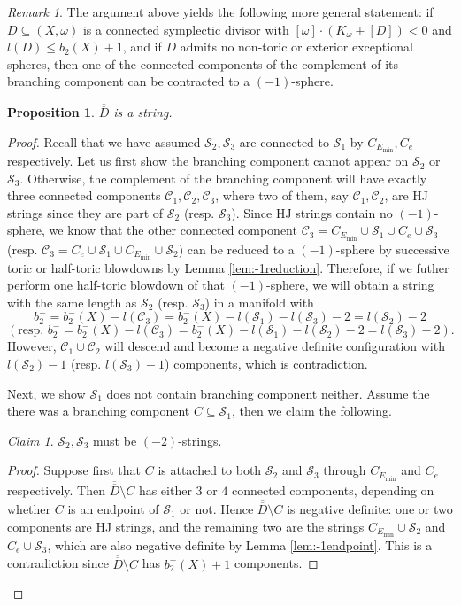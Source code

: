 \documentclass[11pt]{article}
\newtheorem{proposition}[theorem]{Proposition}
\theoremstyle{definition}
\theoremstyle{remark}
\newtheorem{remark}[theorem]{Remark}
\newtheorem{claim}[theorem]{Claim}
\newcommand{\st}{\mathcal{S}}
\begin{document}
\begin{remark}\label{rmk:-1reduction}
  The argument above yields the following more general statement: if $D\subseteq (X,\omega)$ is a connected symplectic divisor with $[\omega]\cdot (K_\omega+[D])<0$ and $l(D)\leq b_2(X)+1$, and if $D$ admits no non-toric or exterior exceptional spheres, then one of the connected components of the complement of its branching component can be contracted to a $(-1)$-sphere.
\end{remark}


\begin{proposition}\label{prop:isstring}
$\overline{\overline{D}}$ is a string.
\end{proposition}

\begin{proof}
  Recall that we have assumed $\st_2,\st_3$ are connected to $\st_1$ by $C_{E_{\text{min}}},C_e$ respectively. Let us first show the branching component cannot appear on $\st_2$ or $\st_3$. Otherwise, the complement of the branching component will have exactly three connected components $\mathcal{C}_1,\mathcal{C}_2,\mathcal{C}_3$, where two of them, say $\mathcal{C}_1,\mathcal{C}_2$, are HJ strings since they are part of $\st_2$ (resp. $\st_3$). Since HJ strings contain no $(-1)$-sphere, we know that the other connected component $\mathcal{C}_3=C_{E_\text{min}}\cup \st_1\cup C_e\cup \st_3$ (resp. $\mathcal{C}_3=C_e\cup \st_1\cup C_{E_\text{min}}\cup \st_2$) can be reduced to a $(-1)$-sphere by successive toric or half-toric blowdowns by Lemma \ref{lem:-1reduction}. Therefore, if we futher perform one half-toric blowdown of that $(-1)$-sphere, we will obtain a string with the same length as $\st_2$ (resp. $\st_3$) in a manifold with \[b_2^-=b_2^-(X)-l(\mathcal{C}_3)=b_2^-(X)-l(\st_1)-l(\st_3)-2=l(\st_2)-2\]
  \[(\text{resp. } b_2^-=b_2^-(X)-l(\mathcal{C}_3)=b_2^-(X)-l(\st_1)-l(\st_2)-2=l(\st_3)-2).\] However, $\mathcal{C}_1\cup \mathcal{C}_2$ will descend and become a negative definite configuration with $l(\st_2)-1$ (resp. $l(\st_3)-1$) components, which is contradiction.

  Next, we show $\st_1$ does not contain branching component neither. Assume the there was a branching component $C\subseteq \st_1$, then we claim the following.
  \begin{claim}
$\st_2,\st_3$ must be $(-2)$-strings.
\end{claim}

\begin{proof}
  Suppose first that $C$ is attached to both $\st_2$ and $\st_3$ through $C_{E_{\text{min}}}$ and $C_e$ respectively. Then $\overline{\overline{D}}\setminus C$ has either $3$ or $4$ connected components, depending on whether $C$ is an endpoint of $\st_1$ or not. Hence $\overline{\overline{D}}\setminus C$ is negative definite: one or two components are HJ strings, and the remaining two are the strings $C_{E_{\text{min}}}\cup \st_2$ and $C_e\cup \st_3$, which are also negative definite by Lemma \ref{lem:-1endpoint}. This is a contradiction since $\overline{\overline{D}}\setminus C$ has $b_2^-(X)+1$ components. 
  

\end{proof}
\end{proof}
\end{document}

